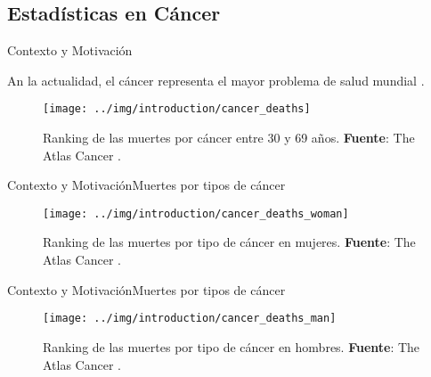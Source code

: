 \documentclass[10pt]{beamer}
\newcommand{\1}{
	\setbeamertemplate{background}{
		\texttt{[image: img/1]}
		\tikz[overlay] \fill[fill opacity=0.75,fill=white] (0,0) rectangle (-\paperwidth,\paperheight);
	}
}
\begin{document}
\subsection{Estadísticas en Cáncer}


\begin{frame}{Contexto y Motivación}{}
	\begin{block}{}
		An la actualidad, el cáncer representa el mayor problema de salud mundial \cite{siegel2023cancer}.
	\end{block}

	\begin{figure}[]
		\centering
		\texttt{[image: ../img/introduction/cancer\_deaths]}
		\caption{Ranking de las muertes por cáncer entre 30 y 69 años. \textbf{Fuente}: The Atlas Cancer \cite{canceratlas2023}.}
	\end{figure}
\end{frame}

\begin{frame}{Contexto y Motivación}{Muertes por tipos de cáncer}
	\begin{figure}[]
		\centering
		\texttt{[image: ../img/introduction/cancer\_deaths\_woman]}
		\caption{Ranking de las muertes por tipo de cáncer en mujeres. \textbf{Fuente}: The Atlas Cancer \cite{canceratlas2023}.}
	\end{figure}
\end{frame}


\begin{frame}{Contexto y Motivación}{Muertes por tipos de cáncer}
	\begin{figure}[]
		\centering
		\texttt{[image: ../img/introduction/cancer\_deaths\_man]}
		\caption{Ranking de las muertes por tipo de cáncer en hombres. \textbf{Fuente}: The Atlas Cancer \cite{canceratlas2023}.}
	\end{figure}
\end{frame}
\end{document}
